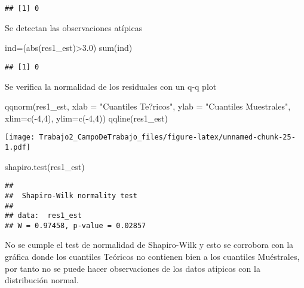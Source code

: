 \documentclass[
]{article}
\newenvironment{Shaded}{\begin{snugshade}}{\end{snugshade}}
\newcommand{\AttributeTok}[1]{\textcolor[rgb]{0.77,0.63,0.00}{#1}}
\newcommand{\DecValTok}[1]{\textcolor[rgb]{0.00,0.00,0.81}{#1}}
\newcommand{\FloatTok}[1]{\textcolor[rgb]{0.00,0.00,0.81}{#1}}
\newcommand{\FunctionTok}[1]{\textcolor[rgb]{0.00,0.00,0.00}{#1}}
\newcommand{\NormalTok}[1]{#1}
\newcommand{\OtherTok}[1]{\textcolor[rgb]{0.56,0.35,0.01}{#1}}
\newcommand{\SpecialCharTok}[1]{\textcolor[rgb]{0.00,0.00,0.00}{#1}}
\newcommand{\StringTok}[1]{\textcolor[rgb]{0.31,0.60,0.02}{#1}}
\begin{document}
\begin{verbatim}
## [1] 0
\end{verbatim}

Se detectan las observaciones atípicas

\begin{Shaded}
\begin{Highlighting}[]
\NormalTok{ind}\OtherTok{=}\NormalTok{(}\FunctionTok{abs}\NormalTok{(res1\_est)}\SpecialCharTok{\textgreater{}}\FloatTok{3.0}\NormalTok{)}
\FunctionTok{sum}\NormalTok{(ind)}
\end{Highlighting}
\end{Shaded}

\begin{verbatim}
## [1] 0
\end{verbatim}

Se verifica la normalidad de los residuales con un q-q plot

\begin{Shaded}
\begin{Highlighting}[]
\FunctionTok{qqnorm}\NormalTok{(res1\_est, }\AttributeTok{xlab =} \StringTok{"Cuantiles Te?ricos"}\NormalTok{, }\AttributeTok{ylab =} \StringTok{"Cuantiles Muestrales"}\NormalTok{,}
\AttributeTok{xlim=}\FunctionTok{c}\NormalTok{(}\SpecialCharTok{{-}}\DecValTok{4}\NormalTok{,}\DecValTok{4}\NormalTok{), }\AttributeTok{ylim=}\FunctionTok{c}\NormalTok{(}\SpecialCharTok{{-}}\DecValTok{4}\NormalTok{,}\DecValTok{4}\NormalTok{))}
\FunctionTok{qqline}\NormalTok{(res1\_est)}
\end{Highlighting}
\end{Shaded}

\texttt{[image: Trabajo2\_CampoDeTrabajo\_files/figure-latex/unnamed-chunk-25-1.pdf]}

\begin{Shaded}
\begin{Highlighting}[]
\FunctionTok{shapiro.test}\NormalTok{(res1\_est)}
\end{Highlighting}
\end{Shaded}

\begin{verbatim}
## 
##  Shapiro-Wilk normality test
## 
## data:  res1_est
## W = 0.97458, p-value = 0.02857
\end{verbatim}

No se cumple el test de normalidad de Shapiro-Wilk y esto se corrobora
con la gráfica donde los cuantiles Teóricos no contienen bien a los
cuantiles Muéstrales, por tanto no se puede hacer observaciones de los
datos atipicos con la distribución normal.
\end{document}
